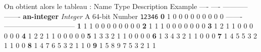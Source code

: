 On obtient alors le tableau : Name Type Description Example ---- ----
----------- ------- \textbf{an-integer} \emph{Integer} A 64-bit Number
\texttt{12346} \textbar{} \textbf{0} \textbar{} 1 \textbar{} 0
\textbar{} 0 \textbar{} 0 \textbar{} 0 \textbar{} 0 \textbar{} 0
\textbar{} 0 \textbar{} 0 \textbar{} 0 \textbar{}
\textbar-------\textbar---\textbar---\textbar---\textbar---\textbar---\textbar---\textbar---\textbar---\textbar---\textbar---\textbar{}
\textbar{} \textbf{1} \textbar{} 1 \textbar{} 1 \textbar{} 0 \textbar{}
0 \textbar{} 0 \textbar{} 0 \textbar{} 0 \textbar{} 0 \textbar{} 0
\textbar{} 0 \textbar{} \textbar{} \textbf{2} \textbar{} 1 \textbar{} 1
\textbar{} 1 \textbar{} 0 \textbar{} 0 \textbar{} 0 \textbar{} 0
\textbar{} 0 \textbar{} 0 \textbar{} 0 \textbar{} \textbar{} \textbf{3}
\textbar{} 1 \textbar{} 2 \textbar{} 1 \textbar{} 1 \textbar{} 0
\textbar{} 0 \textbar{} 0 \textbar{} 0 \textbar{} 0 \textbar{} 0
\textbar{} \textbar{} \textbf{4} \textbar{} 1 \textbar{} 2 \textbar{} 2
\textbar{} 1 \textbar{} 1 \textbar{} 0 \textbar{} 0 \textbar{} 0
\textbar{} 0 \textbar{} 0 \textbar{} \textbar{} \textbf{5} \textbar{} 1
\textbar{} 3 \textbar{} 3 \textbar{} 2 \textbar{} 1 \textbar{} 1
\textbar{} 0 \textbar{} 0 \textbar{} 0 \textbar{} 0 \textbar{}
\textbar{} \textbf{6} \textbar{} 1 \textbar{} 3 \textbar{} 4 \textbar{}
3 \textbar{} 2 \textbar{} 1 \textbar{} 1 \textbar{} 0 \textbar{} 0
\textbar{} 0 \textbar{} \textbar{} \textbf{7} \textbar{} 1 \textbar{} 4
\textbar{} 5 \textbar{} 5 \textbar{} 3 \textbar{} 2 \textbar{} 1
\textbar{} 1 \textbar{} 0 \textbar{} 0 \textbar{} \textbar{} \textbf{8}
\textbar{} 1 \textbar{} 4 \textbar{} 7 \textbar{} 6 \textbar{} 5
\textbar{} 3 \textbar{} 2 \textbar{} 1 \textbar{} 1 \textbar{} 0
\textbar{} \textbar{} \textbf{9} \textbar{} 1 \textbar{} 5 \textbar{} 8
\textbar{} 9 \textbar{} 7 \textbar{} 5 \textbar{} 3 \textbar{} 2
\textbar{} 1 \textbar{} 1 \textbar{}
